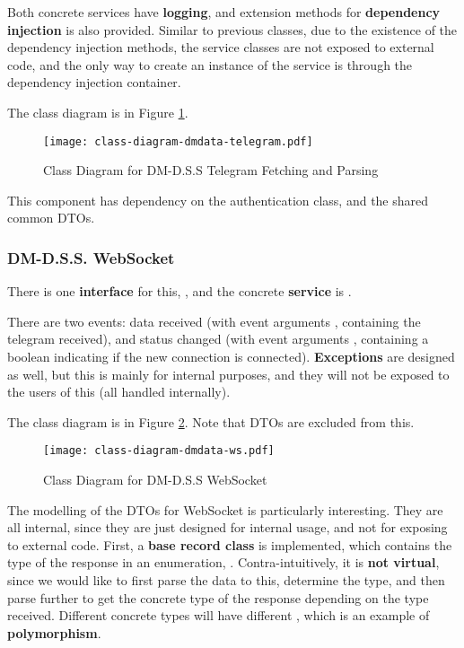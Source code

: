 Both concrete services have \textbf{logging}, and extension methods for \textbf{dependency injection} is also provided. Similar to previous classes, due to the existence of the dependency injection methods, the service classes are not exposed to external code, and the only way to create an instance of the service is through the dependency injection container.

The class diagram is in Figure \ref{fig:class-diagram-dmdata-telegram}.

\begin{figure}[htp]
    \centering
    \texttt{[image: class-diagram-dmdata-telegram.pdf]}
    \caption{Class Diagram for DM-D.S.S Telegram Fetching and Parsing}
    \label{fig:class-diagram-dmdata-telegram}
\end{figure}

This component has dependency on the authentication class, and the shared common DTOs.

\subsubsection{DM-D.S.S. WebSocket}

There is one \textbf{interface} for this, , and the concrete \textbf{service} is .

There are two events: data received (with event arguments , containing the telegram received), and status changed (with event arguments , containing a boolean indicating if the new connection is connected). \textbf{Exceptions} are designed as well, but this is mainly for internal purposes, and they will not be exposed to the users of this (all handled internally).

The class diagram is in Figure \ref{fig:class-diagram-dmdata-ws}. Note that DTOs are excluded from this.

\begin{figure}[htp]
    \centering
    \texttt{[image: class-diagram-dmdata-ws.pdf]}
    \caption{Class Diagram for DM-D.S.S WebSocket}
    \label{fig:class-diagram-dmdata-ws}
\end{figure}


The modelling of the DTOs for WebSocket is particularly interesting. They are all internal, since they are just designed for internal usage, and not for exposing to external code. First, a \textbf{base record class}  is implemented, which contains the type of the response in an enumeration, . Contra-intuitively, it is \textbf{not virtual}, since we would like to first parse the data to this, determine the type, and then parse further to get the concrete type of the response depending on the type received. Different concrete types will have different , which is an example of \textbf{polymorphism}.

